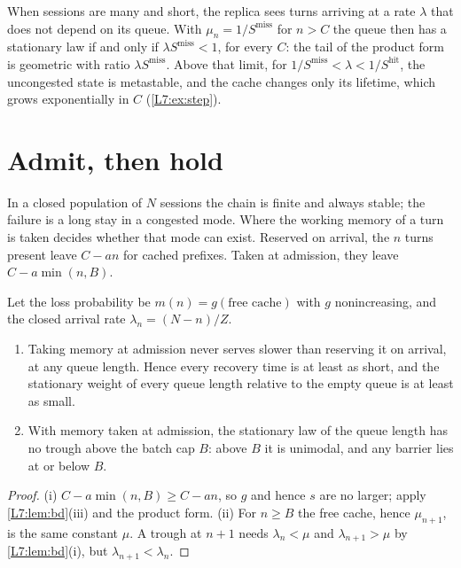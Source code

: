 \begin{remark}\label{L7:rem:open}
When sessions are many and short, the replica sees turns arriving at a rate $\lambda$ that
does not depend on its queue. With $\mu_n=1/S^{\mathrm{miss}}$ for $n>C$ the queue then
has a stationary law if and only if $\lambda S^{\mathrm{miss}}<1$, for every $C$: the tail
of the product form is geometric with ratio $\lambda S^{\mathrm{miss}}$. Above that limit, for
$1/S^{\mathrm{miss}}<\lambda<1/S^{\mathrm{hit}}$, the uncongested state is metastable, and
the cache changes only its lifetime, which grows exponentially in $C$
(\cref{L7:ex:step}).
\end{remark}

\section{Admit, then hold}\label{L7:sec:hold}

In a closed population of $N$ sessions the chain is finite and always stable; the
failure is a long stay in a congested mode. Where the working memory of a turn is taken
decides whether that mode can exist. Reserved on arrival, the $n$ turns present leave
$C-an$ for cached prefixes. Taken at admission, they leave $C-a\min(n,B)$.

\begin{proposition}\label{L7:prop:hold}
Let the loss probability be $m(n)=g(\text{free cache})$ with $g$ nonincreasing, and the
closed arrival rate $\lambda_n=(N-n)/Z$.
\begin{enumerate}[label=(\roman*)]
\item Taking memory at admission never serves slower than reserving it on arrival, at any
  queue length. Hence every recovery time is at least as short, and the stationary weight
  of every queue length relative to the empty queue is at least as small.
\item With memory taken at admission, the stationary law of the queue length has no
  trough above the batch cap $B$: above $B$ it is unimodal, and any barrier lies at or
  below $B$.
\end{enumerate}
\end{proposition}
\begin{proof}
(i) $C-a\min(n,B)\ge C-an$, so $g$ and hence $s$ are no larger; apply
\cref{L7:lem:bd}(iii) and the product form. (ii) For $n\ge B$ the free cache, hence
$\mu_{n+1}$, is the same constant $\mu$. A trough at $n+1$ needs $\lambda_n<\mu$ and
$\lambda_{n+1}>\mu$ by \cref{L7:lem:bd}(i), but $\lambda_{n+1}<\lambda_n$.
\end{proof}

